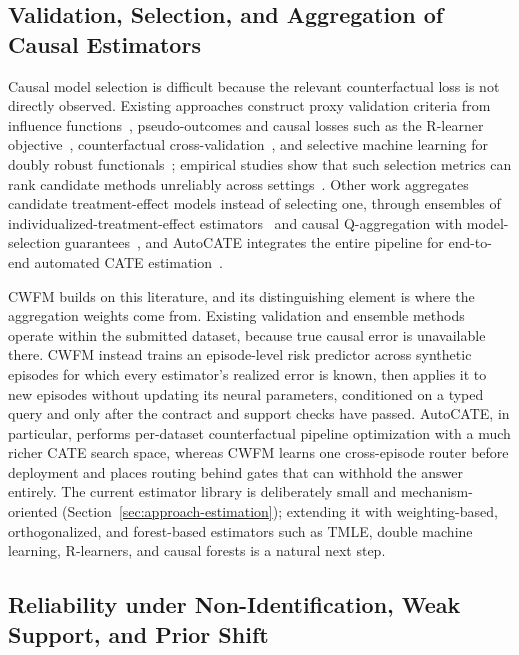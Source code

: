 \documentclass[electronics,article,submit,oneauthor]{Definitions/mdpi}
\begin{document}
\subsection{Validation, Selection, and Aggregation of Causal Estimators}\label{sec:related-selection}

Causal model selection is difficult because the relevant counterfactual loss is not directly observed. Existing approaches construct proxy validation criteria from influence functions~\cite{alaa2019validating}, pseudo-outcomes and causal losses such as the R-learner objective~\cite{nie2021rlearner}, counterfactual cross-validation~\cite{saito2020counterfactualcv}, and selective machine learning for doubly robust functionals~\cite{cui2024selective}; empirical studies show that such selection metrics can rank candidate methods unreliably across settings~\cite{curth2023search,mahajan2024empirical}. Other work aggregates candidate treatment-effect models instead of selecting one, through ensembles of individualized-treatment-effect estimators~\cite{han2022ensemble} and causal Q-aggregation with model-selection guarantees~\cite{lan2024qaggregation}, and AutoCATE integrates the entire pipeline for end-to-end automated CATE estimation~\cite{vanderschueren2025autocate}.

CWFM builds on this literature, and its distinguishing element is where the aggregation weights come from. Existing validation and ensemble methods operate within the submitted dataset, because true causal error is unavailable there. CWFM instead trains an episode-level risk predictor across synthetic episodes for which every estimator's realized error is known, then applies it to new episodes without updating its neural parameters, conditioned on a typed query and only after the contract and support checks have passed. AutoCATE, in particular, performs per-dataset counterfactual pipeline optimization with a much richer CATE search space, whereas CWFM learns one cross-episode router before deployment and places routing behind gates that can withhold the answer entirely. The current estimator library is deliberately small and mechanism-oriented (Section~\ref{sec:approach-estimation}); extending it with weighting-based, orthogonalized, and forest-based estimators such as TMLE, double machine learning, R-learners, and causal forests is a natural next step.

\subsection{Reliability under Non-Identification, Weak Support, and Prior Shift}\label{sec:related-reliability}
\end{document}
